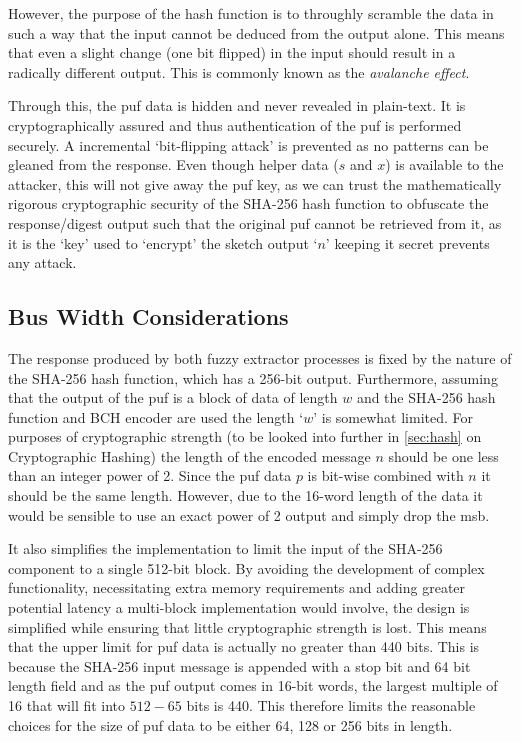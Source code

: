 However, the purpose of the hash function is to throughly scramble the data in
such a way that the input cannot be deduced from the output alone. This means
that even a slight change (one bit flipped) in the input should result in a
radically different output. This is commonly known as the \emph{avalanche effect}\cite{feistel1973cryptography}.

Through this, the \gls{puf} data is hidden and never revealed in plain-text.
It is cryptographically assured and thus authentication of the \gls{puf} is
performed securely. A incremental `bit-flipping attack' is prevented as no
patterns can be gleaned from the response.
Even though helper data ($s$ and $x$) is available to the attacker, this will not give away
the \gls{puf} key, as we can trust the mathematically rigorous cryptographic security
of the SHA-256 hash function to obfuscate the response/digest output such that
the original \gls{puf} cannot be retrieved from it, as it is the `key' used to
`encrypt' the sketch output `$n$' keeping it secret prevents any attack.

\subsection{Bus Width Considerations}
The response produced by both fuzzy extractor processes is fixed by the nature of
the SHA-256 hash function, which has a 256-bit output.
Furthermore, assuming that the output of the \gls{puf} is a block of data of length
$w$ and the SHA-256 hash function and BCH encoder are used the length $w$ is
somewhat limited.
For purposes of cryptographic strength (to be looked into further in \autoref{sec:hash}
on Cryptographic Hashing) the length of the encoded message $n$ should be one
less than an integer power of 2.
Since the \gls{puf} data $p$ is bit-wise combined with $n$ it should be the
same length. However, due to the 16-word length of the data it would be sensible
to use an exact power of 2 output and simply drop the \gls{msb}.

It also
simplifies the implementation to limit the input of the SHA-256 component to a
single 512-bit block. By avoiding the development of complex functionality,
necessitating extra memory requirements and adding greater potential latency a multi-block
implementation would involve, the design is simplified while ensuring that
little cryptographic strength is lost.
This means
that the upper limit for \gls{puf} data is actually no greater than 440 bits.
This is because the SHA-256 input message is appended with a stop bit
and 64 bit length field and as the \gls{puf} output comes in 16-bit words,
the largest multiple of 16 that will fit into $512 - 65$ bits is 440.
This therefore limits the reasonable choices
for the size of \gls{puf} data to be either 64, 128 or 256 bits in length.

